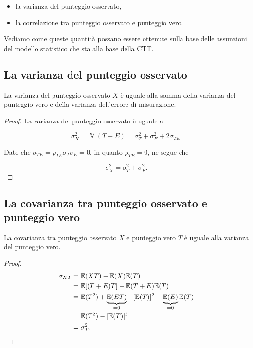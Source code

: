 \documentclass[
  11pt,
]{krantz}
\providecommand{\tightlist}{%
  \setlength{\itemsep}{0pt}\setlength{\parskip}{0pt}}
\DeclareMathOperator{\V}{\mathbb{V}} %
\newcommand{\E}{\mathbb{E}} %
\theoremstyle{definition}
\theoremstyle{definition}
\theoremstyle{definition}
\theoremstyle{definition}
\theoremstyle{remark}
\begin{document}
\begin{itemize}
\tightlist
\item
  la varianza del punteggio osservato,
\item
  la correlazione tra punteggio osservato e punteggio vero.
\end{itemize}

Vediamo come queste quantità possano essere ottenute sulla base delle assunzioni del modello statistico che sta alla base della CTT.

\hypertarget{la-varianza-del-punteggio-osservato}{%
\subsection{La varianza del punteggio osservato}\label{la-varianza-del-punteggio-osservato}}

La varianza del punteggio osservato \(X\) è uguale alla somma della varianza del punteggio vero e della varianza dell'errore di misurazione.

\begin{proof}
La varianza del punteggio osservato è uguale a

\[
\sigma^2_X =  \V(T+E) =  \sigma_T^2 + \sigma_E^2 + 2 \sigma_{TE}.
\label{eq:3-2-4}
\]

Dato che \(\sigma_{TE}=\rho_{TE}\sigma_T \sigma_E=0\), in quanto \(\rho_{TE}=0\), ne segue che

\[
\sigma^2_X =   \sigma_T^2 + \sigma_E^2.
\label{eq:var-sum}
\]
\end{proof}

\hypertarget{la-covarianza-tra-punteggio-osservato-e-punteggio-vero}{%
\subsection{La covarianza tra punteggio osservato e punteggio vero}\label{la-covarianza-tra-punteggio-osservato-e-punteggio-vero}}

La covarianza tra punteggio osservato \(X\) e punteggio vero \(T\) è uguale alla varianza del punteggio vero.

\begin{proof}
\begin{equation}
\begin{aligned}
\sigma_{X T} &= \E(XT) - \E(X)\E(T)\notag\\
&=  \E[(T+E)T] - \E(T+E)\E(T)\notag\\
&=  \E(T^2) + \underbrace{\E(ET)}_{=0} - [\E(T)]^2 -  \underbrace{\E(E)}_{=0} \E(T)\notag\\
&=\E(T^2) - [\E(T)]^2\notag \\
&= \sigma_T^2.
\end{aligned}
\end{equation}
\end{proof}
\end{document}
